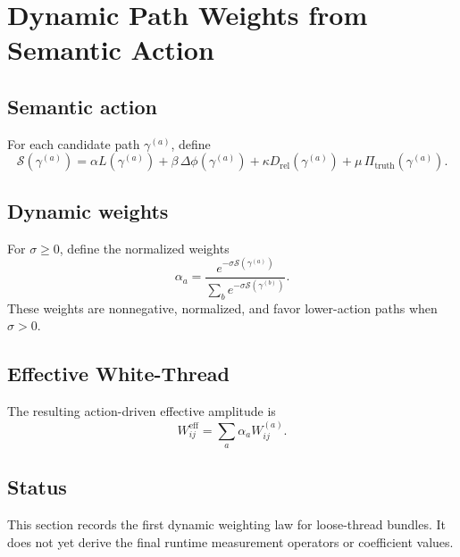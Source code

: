 \section{Dynamic Path Weights from Semantic Action}
\label{sec:dynamic-path-weights}

\subsection{Semantic action}
For each candidate path $\gamma^{(a)}$, define
\begin{equation}
\mathcal S(\gamma^{(a)}) = \alpha L(\gamma^{(a)}) + \beta\,\Delta\phi(\gamma^{(a)}) + \kappa D_{\mathrm{rel}}(\gamma^{(a)}) + \mu\,\Pi_{\mathrm{truth}}(\gamma^{(a)}).
\end{equation}

\subsection{Dynamic weights}
For $\sigma\ge 0$, define the normalized weights
\begin{equation}
\alpha_a = \frac{e^{-\sigma \mathcal S(\gamma^{(a)})}}{\sum_b e^{-\sigma \mathcal S(\gamma^{(b)})}}.
\end{equation}
These weights are nonnegative, normalized, and favor lower-action paths when $\sigma>0$.

\subsection{Effective White-Thread}
The resulting action-driven effective amplitude is
\begin{equation}
W_{ij}^{\mathrm{eff}} = \sum_a \alpha_a W_{ij}^{(a)}.
\end{equation}

\subsection{Status}
This section records the first dynamic weighting law for loose-thread bundles. It does not yet derive the final runtime measurement operators or coefficient values.
